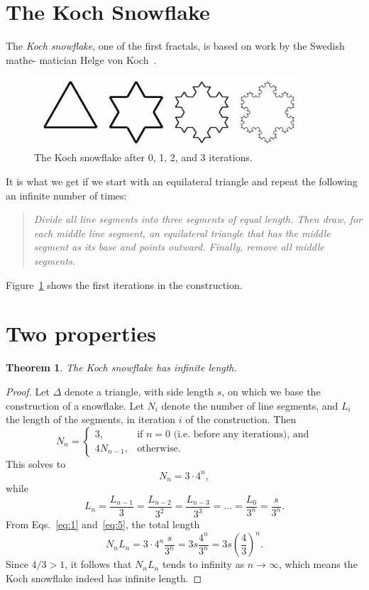 \documentclass[12pt,a4paper]{article}
\newtheorem{theorem}{Theorem}
\begin{document}
\section{The Koch Snowflake}

The \emph{Koch snowflake},
one of the first fractals, is based on work by the Swedish mathe-
matician Helge von Koch~\cite{koch}.
\begin{figure}[h] \label{koch}
  \centering
	\includegraphics[width=10cm]{snowflake.jpg}
  \caption{The Koch snowflake after 0, 1, 2, and 3 iterations. }
\end{figure}
It is what we get if we start with an equilateral triangle and repeat the following an infinite number of times:
\begin{quote}
\textit{Divide all line segments into three segments of equal length. Then draw, for each middle line segment, an equilateral triangle that has the middle segment as its base and points outward. Finally, remove all middle segments.}
\end{quote}
Figure~\ref{koch} shows the first iterations in the construction.
\section{Two properties}
\begin{theorem}
  The Koch snowflake has infinite length. 
\end{theorem}
\begin{proof}
   Let $\Delta$ denote a triangle, with side length $s$, on which we base the construction of a snowflake. Let $N_i$ denote the number of line segments, and $L_i$ the length of the segments, in iteration $i$ of the construction. Then 
  \begin{displaymath}
    N_n=
    \begin{cases}
      3,       &\text{if $n=0$ (i.e.~before any iterations), and} \\ 
      4N_{n-1},&\text{otherwise.}
    \end{cases}
  \end{displaymath}
  This solves to
  \begin{equation}
    \label{eq:1}
    N_n = 3 \cdot 4^n,
  \end{equation}
   while
  \begin{equation}
    \label{eq:5}
    L_n = \frac{L_{n-1}}{3} = \frac{L_{n-2}}{3^2} = \frac{L_{n-3}}{3^3} = \ldots = \frac{L_0}{3^n} = \frac{s}{3^n}.
  \end{equation}
  From Eqs.~\ref{eq:1}  and~\ref{eq:5}, the total length
  \begin{displaymath}
    N_nL_n = 3 \cdot 4^n\frac{s}{3^n} = 3s\frac{4^n}{3^n} = 3s\left(\frac{4}{3}\right)^n.
  \end{displaymath}
  Since $4/3 > 1$, it follows that $N_nL_n$ tends to infinity as $n \to \infty$, which means the Koch snowflake indeed has infinite length.
\end{proof}
\end{document}
